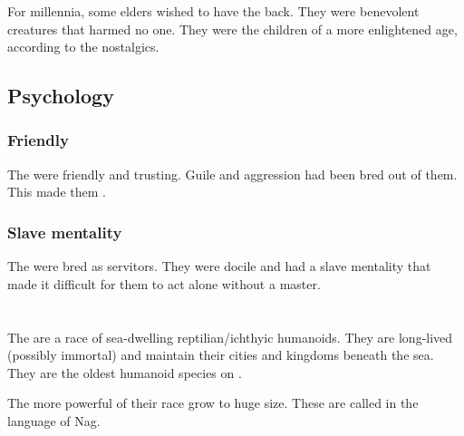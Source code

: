 For millennia, some \quiljaaran{} elders wished to have the \loculs{} back. 
They were benevolent creatures that harmed no one. 
They were the children of a more enlightened age, according to the nostalgics. 









\subsection{Psychology}





\subsubsection{Friendly}
The \loculs{} were friendly and trusting. 
Guile and aggression had been bred out of them. 
This made them . 





\subsubsection{Slave mentality}
The \loculs{} were bred as servitors. 
They were docile and had a slave mentality that made it difficult for them to act alone without a master. 















\section{\Nagae}
The \nagae{} are a race of sea-dwelling reptilian/ichthyic humanoids. 
They are long-lived (possibly immortal) and maintain their cities and kingdoms beneath the sea. They are the oldest humanoid species on \Miith{}. 

The more powerful of their race grow to huge size.
These \nagalords{} are called \nagalords{} in the language of Nag.









